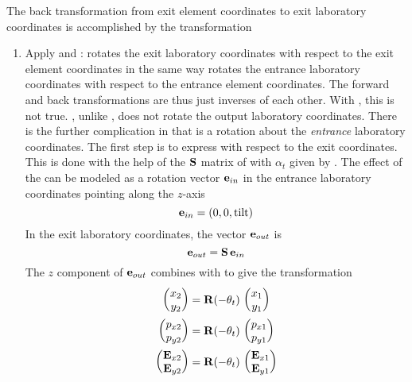 The back transformation from exit element coordinates to exit laboratory coordinates is accomplished
by the transformation
  \begin{enumerate}
  \item
Apply  and :  rotates the exit laboratory coordinates with
respect to the exit element coordinates in the same way  rotates the entrance
laboratory coordinates with respect to the entrance element coordinates. The forward and back
transformations are thus just inverses of each other.  With , this is not true. ,
unlike , does not rotate the output laboratory coordinates.  There is the further
complication in that  is a rotation about the {\em entrance} laboratory coordinates. The
first step is to express  with respect to the exit coordinates. This is done with the help
of the ${\bf S}$ matrix of  with $\alpha_t$ given by . The effect of the  can
be modeled as a rotation vector ${\bf e}_{in}$ in the entrance laboratory coordinates pointing along
the $z$-axis
\begin{equation}
 {\bf e}_{in} = (0, 0, \text{tilt})
\end{equation}
In the exit laboratory coordinates, the vector ${\bf e}_{out}$ is
\begin{equation}
  {\bf e}_{out} = {\bf S} \, {\bf e}_{in}
\end{equation}
The $z$ component of ${\bf e}_{out}$ combines with  to give
the transformation
\begin{align}
  \begin{pmatrix} x_2 \\ y_2 \end{pmatrix} &=
    \bfR (-\theta_{t}) \,   \begin{pmatrix} x_1 \\ y_1 \end{pmatrix} \CRNO
  \begin{pmatrix} p_{x2} \\ p_{y2} \end{pmatrix} &=
    \bfR (-\theta_{t}) \,   \begin{pmatrix} p_{x1} \\ p_{y1} \end{pmatrix} \\
  \begin{pmatrix} \bfE_{x2} \\ \bfE_{y2} \end{pmatrix} &=
    \bfR (-\theta_{t}) \,   \begin{pmatrix} \bfE_{x1} \\ \bfE_{y1} \end{pmatrix} \nonumber

\end{align}
\end{enumerate}
